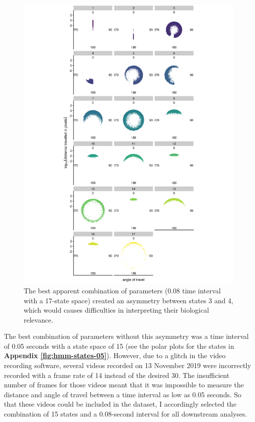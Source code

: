 \documentclass[
]{book}
\begin{document}
\begin{figure}
\includegraphics[width=1\linewidth]{figs/mikk_behaviour/0.08_17_polar_all_dge} \caption{The best apparent combination of parameters (0.08 time interval with a 17-state space) created an asymmetry between states 3 and 4, which would causes difficulties in interpreting their biological relevance.}\label{fig:mikk-hmm-asym}
\end{figure}

The best combination of parameters without this asymmetry was a time interval of 0.05 seconds with a state space of 15 (see the polar plots for the states in \textbf{Appendix \ref{fig:hmm-states-05}}). However, due to a glitch in the video recording software, several videos recorded on 13 November 2019 were incorrectly recorded with a frame rate of 14 instead of the desired 30. The insufficient number of frames for those videos meant that it was impossible to measure the distance and angle of travel between a time interval as low as 0.05 seconds. So that these videos could be included in the dataset, I accordingly selected the combination of 15 states and a 0.08-second interval for all downstream analyses.
\end{document}

